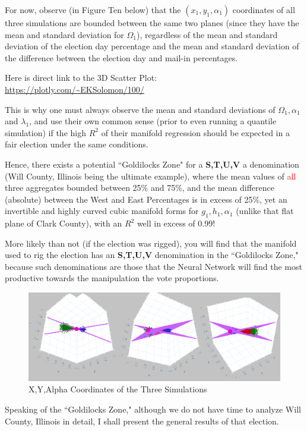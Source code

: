 For now, observe (in Figure Ten below) that the $(x_{1},y_{1},\alpha_{1})$ coordinates of all three simulations are bounded between the same two planes (since they have the mean and standard deviation for $\Omega_{1}$), regardless of the mean and standard deviation of the election day percentage and the mean and standard deviation of the difference between the election day and mail-in percentages.

Here is direct link to the 3D Scatter Plot:\\
\url{https://plotly.com/~EKSolomon/100/}

This is why one must always observe the mean and standard deviations of $\Omega_{1}, \alpha_{1}$ and $\lambda_{1}$, and use their own common sense (prior to even running a quantile simulation) if the high $R^2$ of their manifold regression should be expected in a fair election under the same conditions.

Hence, there exists a potential ``Goldilocks Zone" for a \textbf{S,T,U,V} a denomination (Will County, Illinois being the ultimate example), where the mean values of \textcolor{red}{all} three aggregates bounded between 25\% and 75\%, and the mean difference (absolute) between the West and East Percentages is in excess of 25\%, yet an invertible and highly curved cubic manifold forms for $g_{1},h_{1},\alpha_{1}$ (unlike that flat plane of Clark County), with an $R^2$ well in excess of 0.99!

More likely than not (if the election was rigged), you will find that the manifold used to rig the election has an \textbf{S,T,U,V} denomination in the ``Goldilocks Zone," because such denominations are those that the Neural Network will find the most productive towards the manipulation the vote proportions.

\begin{figure}[bp!]
\begin{center}
\caption{X,Y,Alpha Coordinates of the Three Simulations}
\includegraphics[width=400pt]{Twixtmebb.png}
\end{center}
\end{figure}
\newpage
Speaking of the ``Goldilocks Zone," although we do not have time to analyze Will County, Illinois in detail, I shall present the general results of that election.

